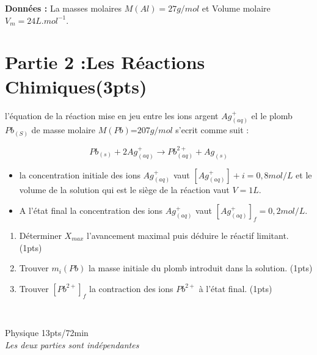 \documentclass[12pt]{article}
\begin{document}
\textbf{Données : }La masses molaires $M(Al) = 27g/mol$ et Volume molaire $V_m = 24 L.mol^{-1}$.


\section*{Partie 2 :Les Réactions Chimiques\dotfill (3pts) }

l’équation de la réaction mise en jeu entre les ions argent $Ag^+_{(aq)}$ el le plomb $Pb_{(S)}$ de masse molaire $M(Pb)$=$207g/mol$ s’ecrit comme suit :

$$Pb_{(s)} + 2Ag^+_{(aq)} \rightarrow Pb^{2+}_{(aq)} + Ag_{(s)}$$

\begin{itemize}
	\item la concentration initiale des ions $Ag^+_{(aq)}$ vaut $[Ag^+_{(aq)}]+i=0,8mol/L$ et le volume de la solution qui est le siège de la réaction vaut $V=1L$.
	\item  A l’état final la concentration des ions $Ag^+_{(aq)}$ vaut $[Ag^+_{(aq)}]_f=0,2mol/L$.
\end{itemize}

\begin{enumerate}
	\item  Déterminer $X_{max}$ l’avancement maximal puis déduire le réactif limitant. \dotfill(1pts)
\item  Trouver $m_{i}(Pb)$ la masse initiale du plomb introduit dans la solution. \dotfill(1pts)
\item  Trouver $[Pb^{2+}]_f$ la contraction des ions $Pb^{2+}$ à l’état final. \dotfill(1pts)
\end{enumerate}




\hrulefill\\
\begin{center}
\hrulefill
\Large{Physique 13pts/72min}
\hrulefill\\
    \emph{Les deux parties sont indépendantes}
\end{center}


\hrulefill\\
\end{document}
